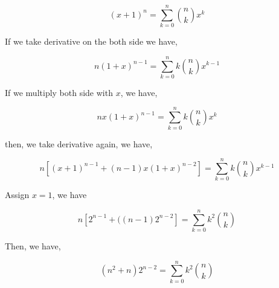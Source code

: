 \documentclass{article}
\begin{document}
$$(x+1)^{n} = \sum \limits_{k=0}^{n} {n \choose k} x^k$$

If we take derivative on the both side we have,

$$n(1+x)^{n-1} = \sum \limits_{k=0}^{n} k {n \choose k} x^{k-1}$$

If we multiply both side with $x$, we have,

$$nx(1+x)^{n - 1} = \sum \limits_{k=0}^{n} k {n \choose k} x^{k}$$

then, we take derivative again, we have,

$$n\left[ (x+1)^{n-1} + (n-1)x(1+x)^{n-2}\right] = \sum \limits_{k=0}^{n} k {n \choose k} x^{k - 1}$$

Assign $x = 1$, we have

$$n\left[ 2^{n-1} + ((n-1)2^{n-2} \right] = \sum \limits_{k=0}^{n} k^2 {n \choose k} $$

Then, we have,

$$(n^2+n)2^{n-2} = \sum \limits_{k=0}^{n} k^2 {n \choose k}$$
\end{document}
